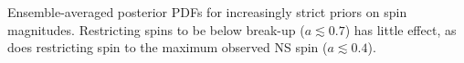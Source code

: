 \label{fig:restricted_priors} Ensemble-averaged posterior PDFs for increasingly strict priors on spin magnitudes.  Restricting spins to be below break-up ($a\lesssim0.7$) has little effect, as does restricting spin to the maximum observed NS spin ($a\lesssim0.4$).